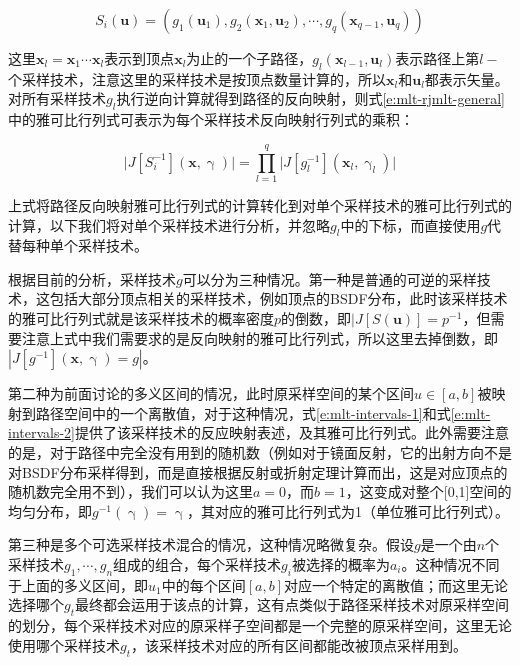 \begin{equation}
	S_i({\mathbf{u}})=(g_1(\mathbf{u}_1),g_2(\mathbf{x}_1,\mathbf{u}_2),\cdots,g_q(\mathbf{x}_{q-1},\mathbf{u}_q))
\end{equation}

\noindent 这里${\mathbf{x}}_l=\mathbf{x}_1\cdots\mathbf{x}_l$表示到顶点$\mathbf{x}_l$为止的一个子路径，$g_l(\mathbf{x}_{l-1},\mathbf{u}_l)$表示路径上第$l-$个采样技术，注意这里的采样技术是按顶点数量计算的，所以$\mathbf{x}_l$和$\mathbf{u}_l$都表示矢量。对所有采样技术$g_l$执行逆向计算就得到路径的反向映射，则式\ref{e:mlt-rjmlt-general}中的雅可比行列式可表示为每个采样技术反向映射行列式的乘积：

\begin{equation}
	\big|J[S^{-1}_i]({\mathbf{x}},{\upgamma})\big|=\prod^{q}_{l=1}\big|J[g^{-1}_l](\mathbf{x}_l,\upgamma_l)\big|
\end{equation}

\noindent 上式将路径反向映射雅可比行列式的计算转化到对单个采样技术的雅可比行列式的计算，以下我们将对单个采样技术进行分析，并忽略$g_l$中的下标，而直接使用$g$代替每种单个采样技术。

根据目前的分析，采样技术$g$可以分为三种情况。第一种是普通的可逆的采样技术，这包括大部分顶点相关的采样技术，例如顶点的BSDF分布，此时该采样技术的雅可比行列式就是该采样技术的概率密度$p$的倒数，即$|J[S(\mathbf{u})]=p^{-1}$，但需要注意上式中我们需要求的是反向映射的雅可比行列式，所以这里去掉倒数，即$|J[g^{-1}](\mathbf{x},\upgamma)=g|$。

第二种为前面讨论的多义区间的情况，此时原采样空间的某个区间$u\in[a,b]$被映射到路径空间中的一个离散值，对于这种情况，式\ref{e:mlt-intervals-1}和式\ref{e:mlt-intervals-2}提供了该采样技术的反应映射表述，及其雅可比行列式。此外需要注意的是，对于路径中完全没有用到的随机数（例如对于镜面反射，它的出射方向不是对BSDF分布采样得到，而是直接根据反射或折射定理计算而出，这是对应顶点的随机数完全用不到），我们可以认为这里$a=0$，而$b=1$，这变成对整个[0,1]空间的均匀分布，即$g^{-1}(\upgamma)=\upgamma$，其对应的雅可比行列式为1（单位雅可比行列式）。

第三种是多个可选采样技术混合的情况，这种情况略微复杂。假设$g$是一个由$n$个采样技术$g_1,\cdots,g_n$组成的组合，每个采样技术$g_i$被选择的概率为$a_i$。这种情况不同于上面的多义区间，即$u_1$中的每个区间$[a,b]$对应一个特定的离散值；而这里无论选择哪个$g_t$最终都会运用于该点的计算，这有点类似于路径采样技术对原采样空间的划分，每个采样技术对应的原采样子空间都是一个完整的原采样空间，这里无论使用哪个采样技术$g_t$，该采样技术对应的所有区间都能改被顶点采样用到。

